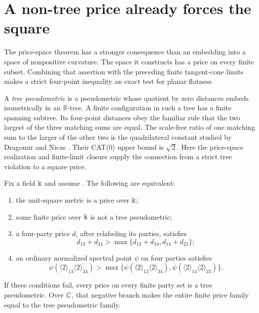 \section{A non-tree price already forces the square}
\label{sec:tree-prices}

The price-space theorem has a stronger consequence than an embedding
into a space of nonpositive curvature.  The space it constructs has
a price on every finite subset.  Combining that assertion with the
preceding finite tangent-cone limits makes a strict four-point
inequality an exact test for planar flatness.

A \emph{tree pseudometric} is a pseudometric whose quotient by zero
distances embeds isometrically in an $\mathbb R$-tree.  A finite
configuration in such a tree has a finite spanning subtree.  Its
four-point distances obey the familiar rule that the two largest
of the three matching sums are equal.
The scale-free ratio of one matching sum to the larger of the
other two is the quadrilateral constant studied by Dragomir and
Nicas \cite[definition on p.~1042; Theorem 4.1 and Corollary 4.1,
p.~1053]{DragomirNicas2021}. Their CAT(0) upper bound is $\sqrt2$.
Here the price-space realization and finite-limit closure supply
the connection from a strict tree violation to a square price.

\begin{theorem}
\label{thm:tree-price-dichotomy}
Fix a field $\Bbbk$ and assume
\cite[Proposition C.3, p.~28]{Anthropic2026}.
The following are equivalent:
\begin{enumerate}
\item the unit-square metric is a price over $\Bbbk$;
\item some finite price over $\Bbbk$ is not a tree pseudometric;
\item a four-party price $d$, after relabeling its parties, satisfies
\begin{equation}\label{eq:strict-tree-price-witness}
d_{13}+d_{24}>
\max\{d_{12}+d_{34},d_{14}+d_{23}\};
\end{equation}
\item an ordinary normalized spectral point $\psi$ on four parties satisfies
\begin{equation}\label{eq:strict-tree-spectral-witness}
\psi(\langle2\rangle_{13}\langle2\rangle_{24})>
\max\{\psi(\langle2\rangle_{12}\langle2\rangle_{34}),
       \psi(\langle2\rangle_{14}\langle2\rangle_{23})\}.
\end{equation}
\end{enumerate}
If these conditions fail, every price on every finite party set is a
tree pseudometric.  Over $\mathbb C$, that negative branch makes the entire
finite price family equal to the tree pseudometric family.
\end{theorem}

